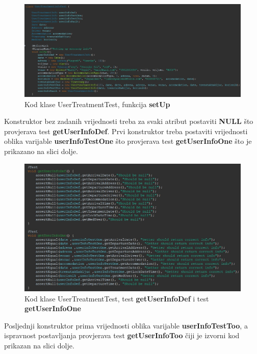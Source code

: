 			\begin{figure}[H]
				\includegraphics[width=\textwidth]{slike/userTreatmentInfoPtOne.JPG}
				\caption{Kod klase UserTreatmentTest, funkcija \textbf{setUp}}
				\label{UserTreatmentInfoTestPtOne}
			\end{figure}
			
			Konstruktor bez zadanih vrijednosti treba za svaki atribut postaviti \textbf{NULL} što provjerava test \textbf{getUserInfoDef}. Prvi konstruktor treba postaviti vrijednosti oblika varijable \textbf{userInfoTestOne} što provjerava test \textbf{getUserInfoOne} što je prikazano na slici dolje.
				
			\begin{figure}[H]
				\includegraphics[width=\textwidth]{slike/userTreatmentInfoPtToo.JPG}
				\caption{Kod klase UserTreatmentTest, test \textbf{getUserInfoDef} i test \textbf{getUserInfoOne}}
				\label{UserTreatmentInfoTestPtToo}
			\end{figure}
			
			 Posljednji konstruktor prima vrijednosti oblika varijable  \textbf{userInfoTestToo}, a ispravnost postavljanja provjerava test \textbf{getUserInfoToo} čiji je izvorni kod prikazan na slici dolje.
			
